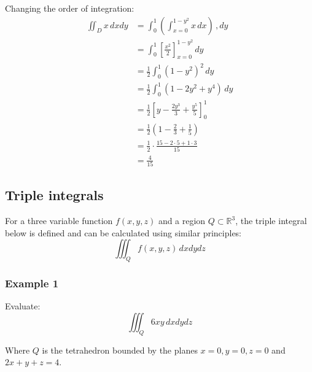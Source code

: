 \documentclass[11pt]{article}
\begin{document}
Changing the order of integration:
\begin{align*}
\iint_D x \, dx dy &= \int_0^1 \left( \int_{x = 0}^{1 - y^2} x \, dx \right) \,, dy \\
&= \int_0^1 \left[\frac{x^2}{2} \right]_{x = 0}^{1 - y^2} \, dy \\
&= \frac{1}{2} \int_0^1 (1 - y^2)^2 \, dy \\
&= \frac{1}{2} \int_0^1 (1 - 2y^2 + y^4) \, dy \\
&= \frac{1}{2} \left[y - \frac{2y^3}{3} + \frac{y^5}{5} \right]_0^1 \\
&= \frac{1}{2} \left(1 - \frac{2}{3} + \frac{1}{5} \right) \\
&= \frac{1}{2} \cdot \frac{15 - 2 \cdot 5 + 1 \cdot 3}{15} \\
&= \frac{4}{15}
\end{align*}

\subsection{Triple integrals}
\label{sec:org97d1c7a}
For a three variable function \(f(x, y, z)\) and a region \(Q \subset \mathbb{R}^3\), the triple integral below is defined and can be calculated using similar principles:
\[\iiint_Q f(x, y, z) \, dx dy dz\]

\subsubsection{Example 1}
\label{sec:orgf86de18}
Evaluate:
\[\iiint_Q 6xy \, dx dy dz\]

Where \(Q\) is the tetrahedron bounded by the planes \(x = 0, y = 0, z= 0\) and \(2x + y + z = 4\).
\end{document}
